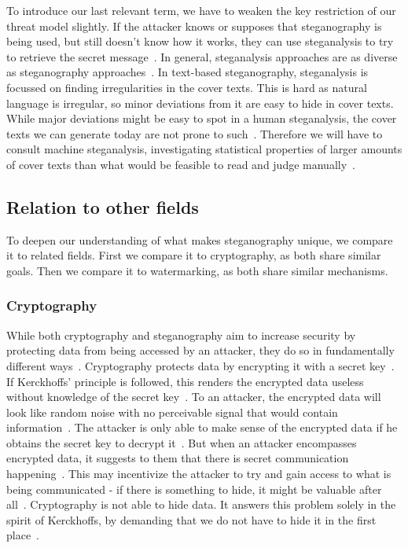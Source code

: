 To introduce our last relevant term, we have to weaken the key restriction of our threat model slightly. If the attacker knows or supposes that steganography is being used, but still doesn't know how it works, they can use steganalysis to try to retrieve the secret message~\cite{bennettLinguisticSteganographySurvey2004}. In general, steganalysis approaches are as diverse as steganography approaches~\cite{bennettLinguisticSteganographySurvey2004}. In text-based steganography, steganalysis is focussed on finding irregularities in the cover texts. This is hard as natural language is irregular, so minor deviations from it are easy to hide in cover texts. While major deviations might be easy to spot in a human steganalysis, the cover texts we can generate today are not prone to such~\cite{wuGenerativeTextSteganography2024}. Therefore we will have to consult machine steganalysis, investigating statistical properties of larger amounts of cover texts than what would be feasible to read and judge manually~\cite{yangSeSyLinguisticSteganalysis2022,wuGenerativeTextSteganography2024}.

\subsection{Relation to other fields}
\label{sec:relationToOtherFields}
To deepen our understanding of what makes steganography unique, we compare it to related fields. First we compare it to cryptography, as both share similar goals. Then we compare it to watermarking, as both share similar mechanisms.

\subsubsection{Cryptography}
\label{sec:cryptography}
While both cryptography and steganography aim to increase security by protecting data from being accessed by an attacker, they do so in fundamentally different ways~\cite{al-aniOverviewMainFundamentals2010,qadirReviewPaperCryptography2019}. Cryptography protects data by encrypting it with a secret key~\cite{qadirReviewPaperCryptography2019}. If Kerckhoffs' principle is followed, this renders the encrypted data useless without knowledge of the secret key~\cite{andersonLimitsSteganography1998,smithEffectiveSecurityObscurity2022}. To an attacker, the encrypted data will look like random noise with no perceivable signal that would contain information~\cite{qadirReviewPaperCryptography2019}. The attacker is only able to make sense of the encrypted data if he obtains the secret key to decrypt it~\cite{malikHighCapacityText2017,qadirReviewPaperCryptography2019}. But when an attacker encompasses encrypted data, it suggests to them that there is secret communication happening~\cite{malikHighCapacityText2017}. This may incentivize the attacker to try and gain access to what is being communicated - if there is something to hide, it might be valuable after all~\cite{malikHighCapacityText2017}. Cryptography is not able to hide data. It answers this problem solely in the spirit of Kerckhoffs, by demanding that we do not have to hide it in the first place~\cite{malikHighCapacityText2017,qadirReviewPaperCryptography2019}.

